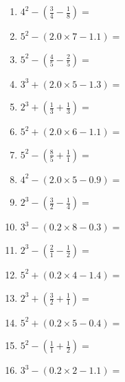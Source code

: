 \documentclass[12pt]{article}
\begin{document}
\begin{enumerate}
\item \large $ 4^{2} - (\frac{3}{4} - \frac{1}{8}) = $ \vspace{1.6cm}
\item \large $ 5^{2} - (2.0 \times 7 - 1.1) = $ \vspace{1.6cm}
\item \large $ 5^{2} - (\frac{4}{5} - \frac{2}{5}) = $ \vspace{1.6cm}
\item \large $ 3^{3} + (2.0 \times 5 - 1.3) = $ \vspace{1.6cm}
\item \large $ 2^{3} + (\frac{1}{3} + \frac{1}{3}) = $ \vspace{1.6cm}
\item \large $ 5^{2} + (2.0 \times 6 - 1.1) = $ \vspace{1.6cm}
\newpage
\item \large $ 5^{2} - (\frac{8}{5} + \frac{1}{1}) = $ \vspace{1.6cm}
\item \large $ 4^{2} - (2.0 \times 5 - 0.9) = $ \vspace{1.6cm}
\item \large $ 2^{3} - (\frac{3}{2} - \frac{1}{4}) = $ \vspace{1.6cm}
\item \large $ 3^{3} - (0.2 \times 8 - 0.3) = $ \vspace{1.6cm}
\item \large $ 2^{3} - (\frac{2}{1} - \frac{1}{2}) = $ \vspace{1.6cm}
\item \large $ 5^{2} + (0.2 \times 4 - 1.4) = $ \vspace{1.6cm}
\item \large $ 2^{3} + (\frac{3}{2} + \frac{1}{1}) = $ \vspace{1.6cm}
\item \large $ 5^{2} + (0.2 \times 5 - 0.4) = $ \vspace{1.6cm}
\item \large $ 5^{2} - (\frac{1}{1} + \frac{1}{2}) = $ \vspace{1.6cm}
\item \large $ 3^{3} - (0.2 \times 2 - 1.1) = $ \vspace{1.6cm}
\end{enumerate}\newpage
\end{document}
